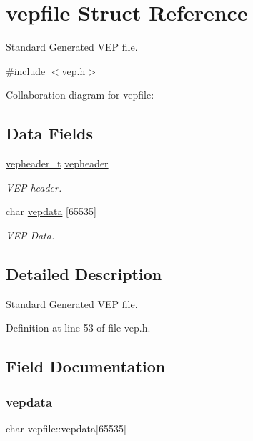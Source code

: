 \hypertarget{a00292}{}\section{vepfile Struct Reference}
\label{a00292}


Standard Generated V\+EP file.  




{\ttfamily \#include $<$vep.\+h$>$}



Collaboration diagram for vepfile\+:
\subsection*{Data Fields}
\begin{DoxyCompactItemize}
\item 
\hyperlink{a00176_a78392c340e1fe1be344df81d1438b74f_a78392c340e1fe1be344df81d1438b74f}{vepheader\+\_\+t} \hyperlink{a00292_a0fa3b39f1e4974d4ed258db1d4b22402_a0fa3b39f1e4974d4ed258db1d4b22402}{vepheader}
\begin{DoxyCompactList}\small\item\em V\+EP header. \end{DoxyCompactList}\item 
char \hyperlink{a00292_a6a40903035403710bf43295c34e883e7_a6a40903035403710bf43295c34e883e7}{vepdata} \mbox{[}65535\mbox{]}
\begin{DoxyCompactList}\small\item\em V\+EP Data. \end{DoxyCompactList}\end{DoxyCompactItemize}


\subsection{Detailed Description}
Standard Generated V\+EP file. 

Definition at line 53 of file vep.\+h.



\subsection{Field Documentation}
\mbox{\label{a00292_a6a40903035403710bf43295c34e883e7_a6a40903035403710bf43295c34e883e7}} 
\subsubsection{\texorpdfstring{vepdata}{vepdata}}
{\footnotesize\ttfamily char vepfile\+::vepdata\mbox{[}65535\mbox{]}}




